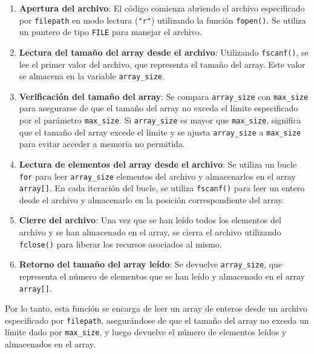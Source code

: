 \begin{enumerate}
    \item \textbf{Apertura del archivo}: El código comienza abriendo el archivo especificado por \texttt{filepath} en modo lectura (\texttt{"r"}) utilizando la función \texttt{fopen()}. Se utiliza un puntero de tipo \texttt{FILE} para manejar el archivo.
    
    \item \textbf{Lectura del tamaño del array desde el archivo}: Utilizando \texttt{fscanf()}, se lee el primer valor del archivo, que representa el tamaño del array. Este valor se almacena en la variable \texttt{array\_size}.
    
    \item \textbf{Verificación del tamaño del array}: Se compara \texttt{array\_size} con \texttt{max\_size} para asegurarse de que el tamaño del array no exceda el límite especificado por el parámetro \texttt{max\_size}. Si \texttt{array\_size} es mayor que \texttt{max\_size}, significa que el tamaño del array excede el límite y se ajusta \texttt{array\_size} a \texttt{max\_size} para evitar acceder a memoria no permitida.
    
    \item \textbf{Lectura de elementos del array desde el archivo}: Se utiliza un bucle \texttt{for} para leer \texttt{array\_size} elementos del archivo y almacenarlos en el array \texttt{array[]}. En cada iteración del bucle, se utiliza \texttt{fscanf()} para leer un entero desde el archivo y almacenarlo en la posición correspondiente del array.
    
    \item \textbf{Cierre del archivo}: Una vez que se han leído todos los elementos del archivo y se han almacenado en el array, se cierra el archivo utilizando \texttt{fclose()} para liberar los recursos asociados al mismo.
    
    \item \textbf{Retorno del tamaño del array leído}: Se devuelve \texttt{array\_size}, que representa el número de elementos que se han leído y almacenado en el array \texttt{array[]}.
\end{enumerate}

Por lo tanto, esta función se encarga de leer un array de enteros desde un archivo especificado por \texttt{filepath}, asegurándose de que el tamaño del array no exceda un límite dado por \texttt{max\_size}, y luego devuelve el número de elementos leídos y almacenados en el array.

